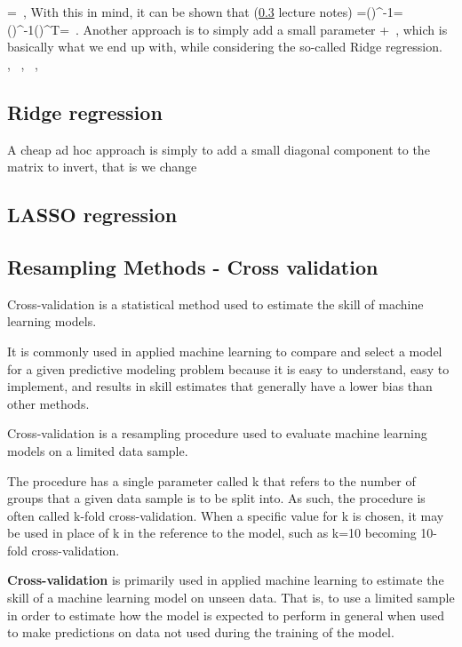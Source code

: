 \be{}
=\, ,
\ee
With this in mind, it can be shown that (\ref{} lecture notes)
\be{}
=\left(\right)^{-1}=\left(\right)^{-1}\left(\right)^T=\, .
\ee
Another approach is to simply add a small parameter
\be{}
\rightarrow{}+\, ,
\ee
which is basically what we end up with, while considering the so-called Ridge regression.
\be{}
\, ,
\ee
\be{}
\, ,
\ee
\be{}
\, ,
\ee

\subsection{Ridge regression}

A cheap ad hoc approach is simply to add a small diagonal component to the matrix to invert, that is we change

\subsection{LASSO regression}

\subsection{Resampling Methods - Cross validation}
Cross-validation is a statistical method used to estimate the skill of machine learning models.

It is commonly used in applied machine learning to compare and select a model for a given predictive modeling problem because it is easy to understand, easy to implement, and results in skill estimates that generally have a lower bias than other methods.

Cross-validation is a resampling procedure used to evaluate machine learning models on a limited data sample.

The procedure has a single parameter called k that refers to the number of groups that a given data sample is to be split into. As such, the procedure is often called k-fold cross-validation. When a specific value for k is chosen, it may be used in place of k in the reference to the model, such as k=10 becoming 10-fold cross-validation.

\textbf{Cross-validation} is primarily used in applied machine learning to estimate the skill of a machine learning model on unseen data. That is, to use a limited sample in order to estimate how the model is expected to perform in general when used to make predictions on data not used during the training of the model.


